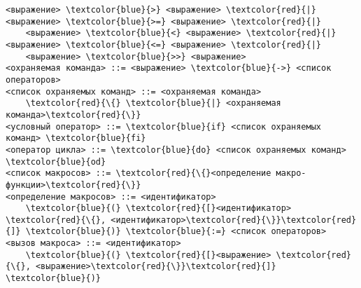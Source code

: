 \begin{Verbatim}[commandchars=\\\{\}]
    <выражение> \textcolor{blue}{>} <выражение> \textcolor{red}{|} <выражение> \textcolor{blue}{>=} <выражение> \textcolor{red}{|}
    <выражение> \textcolor{blue}{<} <выражение> \textcolor{red}{|} <выражение> \textcolor{blue}{<=} <выражение> \textcolor{red}{|}
    <выражение> \textcolor{blue}{>>} <выражение>
<охраняемая команда> ::= <выражение> \textcolor{blue}{->} <список операторов>
<список охраняемых команд> ::= <охраняемая команда> 
    \textcolor{red}{\{} \textcolor{blue}{|} <охраняемая команда>\textcolor{red}{\}}
<условный оператор> ::= \textcolor{blue}{if} <список охраняемых команд> \textcolor{blue}{fi}
<оператор цикла> ::= \textcolor{blue}{do} <список охраняемых команд> \textcolor{blue}{od}
<список макросов> ::= \textcolor{red}{\{}<определение макро-функции>\textcolor{red}{\}}
<определение макросов> ::= <идентификатор>  
    \textcolor{blue}{(} \textcolor{red}{[}<идентификатор> \textcolor{red}{\{}, <идентификатор>\textcolor{red}{\}}\textcolor{red}{]} \textcolor{blue}{)} \textcolor{blue}{:=} <список операторов>
<вызов макроса> ::= <идентификатор> 
    \textcolor{blue}{(} \textcolor{red}{[}<выражение> \textcolor{red}{\{}, <выражение>\textcolor{red}{\}}\textcolor{red}{]} \textcolor{blue}{)}
\end{Verbatim}







